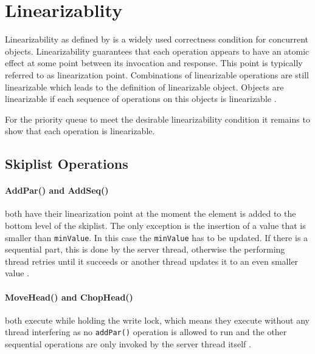 
\section{Linearizablity}
\label{sec:linearizablity}

Linearizability as defined by \citeauthor{herlihy_linearizability:_1990} is a widely used correctness condition for concurrent objects. Linearizability guarantees that each operation appears to have an atomic effect at some point between its invocation and response. This point is typically referred to as linearization point. Combinations of linearizable operations are still linearizable which leads to the definition of linearizable object. Objects are linearizable if each sequence of operations on this objects is linearizable \cite{herlihy_linearizability:_1990}.

For the priority queue to meet the desirable linearizability condition it remains to show that each operation is linearizable. 

\subsection{Skiplist Operations}

\paragraph{AddPar() and AddSeq()}

both have their linearization point at the moment the element is added to the bottom level of the skiplist. The only exception is the insertion of a value that is smaller than \texttt{minValue}. In this case the \texttt{minValue} has to be updated. If there is a sequential part, this is done by the server thread, otherwise the performing thread retries until it succeeds or another thread updates it to an even smaller value  \cite{calciu_adaptive_2014}.


\paragraph{MoveHead() and ChopHead()}

both execute while holding the write lock, which means they execute without any thread interfering as no \texttt{addPar()} operation is allowed to run and the other sequential operations are only invoked by the server thread itself \cite{calciu_adaptive_2014}.

